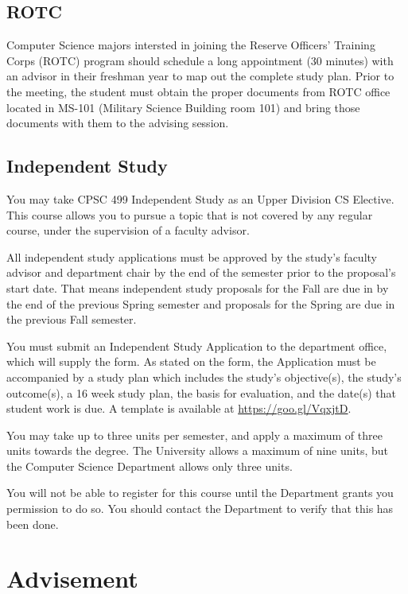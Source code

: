 \documentclass{book}
\begin{document}
\section{ROTC}

Computer Science majors intersted in joining the Reserve Officers' Training
Corps (ROTC) program should schedule a long appointment (30 minutes) with an
advisor in their freshman year to map out the complete study plan.  Prior to
the meeting, the student must obtain the proper documents from ROTC office
located in MS-101 (Military Science Building room 101) and bring those
documents with them to the advising session.

\section{Independent Study}

You may take CPSC 499 Independent Study as an Upper Division CS Elective. This course allows you to pursue a topic that is not covered by any regular course, under the supervision of a faculty advisor.

All independent study applications must be approved by the study's faculty advisor and department chair by the
end of the semester prior to the proposal’s start date. That means independent study proposals for the Fall are due in
by the end of the previous Spring semester and proposals for the Spring are due in the previous Fall semester.

You must submit an Independent Study Application to the department office, which will supply the form. As stated on the form, the Application must be accompanied by a study plan which includes the study's objective(s), the study's outcome(s), a 16 week study plan, the basis for evaluation, and the date(s) that student work is due. A template is available at \url{https://goo.gl/VqxjtD}.

You may take up to three units per semester, and apply a maximum of three units towards the degree. The University allows a maximum of nine units, but the Computer Science Department allows only three units.

You will not be able to register for this course until the Department grants you permission to do so. You should contact the Department to verify that this has been done.

\chapter{Advisement}
\end{document}
